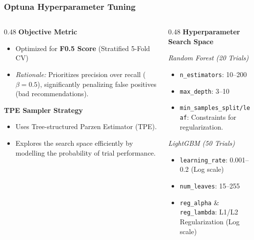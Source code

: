\documentclass[aspectratio=169]{beamer}
\begin{document}
\begin{frame}
	\frametitle{Optuna Hyperparameter Tuning}
	\begin{columns}[T]
		\begin{column}{0.48\textwidth}
			\textbf{Objective Metric}
			\begin{itemize}
				\item Optimized for \textbf{F0.5 Score} (Stratified 5-Fold CV)
				\item \textit{Rationale:} Prioritizes precision over recall ($\beta=0.5$), significantly penalizing false positives (bad recommendations).
			\end{itemize}

			\vspace{0.4cm}
			\textbf{TPE Sampler Strategy}
			\begin{itemize}
				\item Uses Tree-structured Parzen Estimator (TPE).
				\item Explores the search space efficiently by modelling the probability of trial performance.
			\end{itemize}
		\end{column}

		\begin{column}{0.48\textwidth}
			\textbf{Hyperparameter Search Space}

			\textit{Random Forest (20 Trials)}
			\begin{itemize}
				\item \texttt{n\_estimators}: 10--200
				\item \texttt{max\_depth}: 3--10
				\item \texttt{min\_samples\_split/leaf}: Constraints for regularization.
			\end{itemize}

			\vspace{0.2cm}
			\textit{LightGBM (50 Trials)}
			\begin{itemize}
				\item \texttt{learning\_rate}: 0.001--0.2 (Log scale)
				\item \texttt{num\_leaves}: 15--255
				\item \texttt{reg\_alpha} \& \texttt{reg\_lambda}: L1/L2 Regularization (Log scale)
			\end{itemize}
		\end{column}
	\end{columns}
\end{frame}
\end{document}
